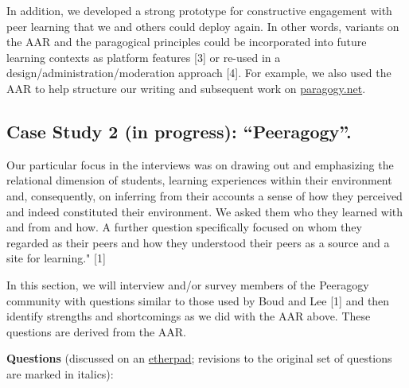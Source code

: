 In addition, we developed a strong prototype for constructive engagement
with peer learning that we and others could deploy again. In other
words, variants on the AAR and the paragogical principles could be
incorporated into future learning contexts as platform features {[}3{]}
or re-used in a design/administration/moderation approach {[}4{]}. For
example, we also used the AAR to help structure our writing and
subsequent work on \href{http://paragogy.net}{paragogy.net}.

\subsection{Case Study 2 (in progress): ``Peeragogy''.}

Our particular focus in the interviews was on drawing out and
emphasizing the relational dimension of students, learning experiences
within their environment and, consequently, on inferring from their
accounts a sense of how they perceived and indeed constituted their
environment. We asked them who they learned with and from and how. A
further question specifically focused on whom they regarded as their
peers and how they understood their peers as a source and a site for
learning." {[}1{]}

In this section, we will interview and/or survey members of the
Peeragogy community with questions similar to those used by Boud and Lee
{[}1{]} and then identify strengths and shortcomings as we did with the
AAR above. These questions are derived from the AAR.

\textbf{Questions} (discussed on an
\href{https://peeragogy.etherpad.mozilla.org/7}{etherpad}; revisions to
the original set of questions are marked in italics):

